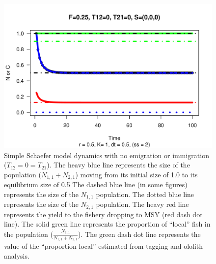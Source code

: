\documentclass[12pt,letterpaper]{article}
\newcommand\None{{N_{1,1}}}
\newcommand\Ntwo{{N_{2,1}}}
\newcommand\Nsum{{N_{1,1}+N_{2,1}}}
\begin{document}
\clearpage
\begin{figure}
\begin{center}
\includegraphics[height=0.7\textwidth]{./graphics/r05F025T120T210S000.png}
\caption{\label{fig:noxfer}
Simple Schaefer model dynamics with no emigration or immigration
($T_{12} = 0 = T_{21}$).
The heavy blue line represents the size of the population ($\Nsum$) moving
from its initial size of 1.0 to its equilibrium size of 0.5
The dashed blue line (in some figures) represents the size of the
$\None$ population.
The dotted blue line represents the size of the $\Ntwo$ population.
The heavy red line represents the yield to the fishery dropping to MSY
(red dash dot line).
The solid green line represents the proportion of ``local'' fish in
the population ($\frac{\None}{\Nsum}$).
The green dash dot line represents the value of the ``proportion
local'' estimated from tagging and ololith analysis.
}
\end{center}
\end{figure}

\end{document}

